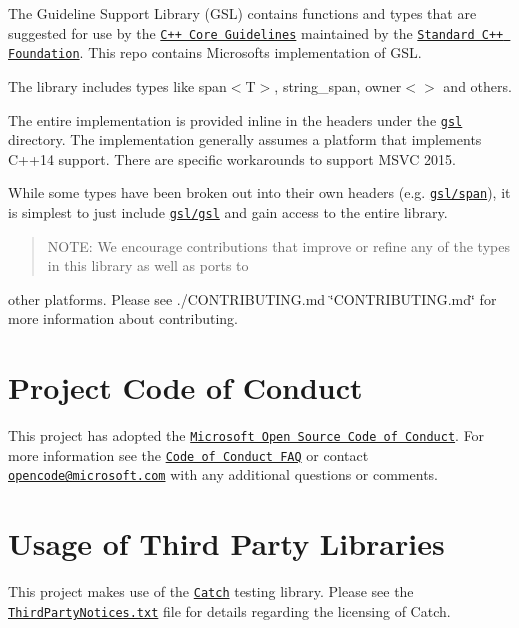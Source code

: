The Guideline Support Library (G\+SL) contains functions and types that are suggested for use by the \href{https://github.com/isocpp/CppCoreGuidelines}{\tt C++ Core Guidelines} maintained by the \href{https://isocpp.org}{\tt Standard C++ Foundation}. This repo contains Microsoft\textquotesingle{}s implementation of G\+SL.

The library includes types like {\ttfamily span$<$T$>$}, {\ttfamily string\+\_\+span}, {\ttfamily owner$<$$>$} and others.

The entire implementation is provided inline in the headers under the \href{./include/gsl}{\tt gsl} directory. The implementation generally assumes a platform that implements C++14 support. There are specific workarounds to support M\+S\+VC 2015.

While some types have been broken out into their own headers (e.\+g. \href{./include/gsl/span}{\tt gsl/span}), it is simplest to just include \href{./include/gsl/gsl}{\tt gsl/gsl} and gain access to the entire library.

\begin{quote}
N\+O\+TE\+: We encourage contributions that improve or refine any of the types in this library as well as ports to \end{quote}
other platforms. Please see ./\+C\+O\+N\+T\+R\+I\+B\+U\+T\+I\+NG.md \char`\"{}\+C\+O\+N\+T\+R\+I\+B\+U\+T\+I\+N\+G.\+md\char`\"{} for more information about contributing.

\section*{Project Code of Conduct}

This project has adopted the \href{https://opensource.microsoft.com/codeofconduct/}{\tt Microsoft Open Source Code of Conduct}. For more information see the \href{https://opensource.microsoft.com/codeofconduct/faq/}{\tt Code of Conduct F\+AQ} or contact \href{mailto:opencode@microsoft.com}{\tt opencode@microsoft.\+com} with any additional questions or comments.

\section*{Usage of Third Party Libraries}

This project makes use of the \href{https://github.com/philsquared/catch}{\tt Catch} testing library. Please see the \href{./ThirdPartyNotices.txt}{\tt Third\+Party\+Notices.\+txt} file for details regarding the licensing of Catch.


